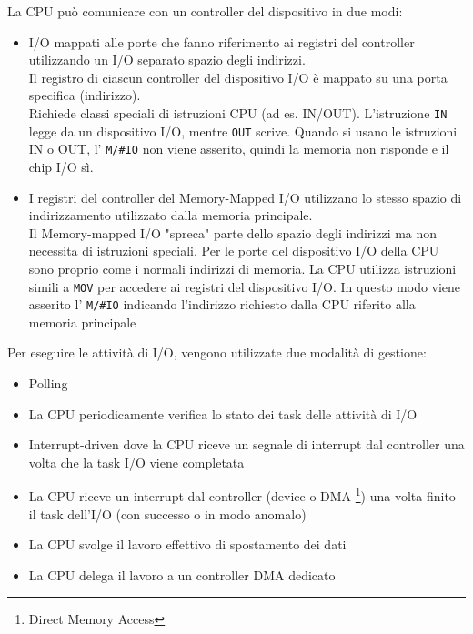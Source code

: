 \documentclass{article}
\begin{document}
    La CPU può comunicare con un controller del dispositivo in due modi:
    \begin{itemize}
        \item I/O mappati alle porte che fanno riferimento ai registri del controller utilizzando un I/O separato
        spazio degli indirizzi. \\Il registro di ciascun controller del dispositivo I/O è mappato su una porta specifica (indirizzo).\\
        Richiede classi speciali di istruzioni CPU (ad es. IN/OUT). L'istruzione \texttt{IN} legge da un dispositivo I/O, mentre \texttt{OUT} scrive. Quando si usano le istruzioni IN o OUT, l' \texttt{M/\#IO} non viene asserito, quindi la memoria non risponde e il chip I/O sì.
        \item I registri del controller del Memory-Mapped I/O utilizzano lo stesso spazio di indirizzamento utilizzato dalla memoria principale.\\Il Memory-mapped I/O "spreca" parte dello spazio degli indirizzi ma non necessita di istruzioni speciali. Per le porte del dispositivo I/O della CPU sono proprio come i normali indirizzi di memoria. La CPU utilizza istruzioni simili a \texttt{MOV} per accedere ai registri del dispositivo I/O. In questo modo viene asserito l' \texttt{M/\#IO} indicando l'indirizzo richiesto dalla CPU riferito alla memoria principale
    \end{itemize}
    Per eseguire le attività di I/O, vengono utilizzate due modalità di gestione:
    \begin{itemize}
        \item Polling
        \item La CPU periodicamente verifica lo stato dei task delle attività di I/O
        \item Interrupt-driven dove la CPU riceve un segnale di interrupt dal controller una volta che la task I/O viene completata
        \item La CPU riceve un interrupt dal controller (device o DMA \footnote{Direct Memory Access}) una volta finito il task dell'I/O (con successo o in modo anomalo)
        \item La CPU svolge il lavoro effettivo di spostamento dei dati
        \item La CPU delega il lavoro a un controller DMA dedicato
    \end{itemize}
\end{document}
